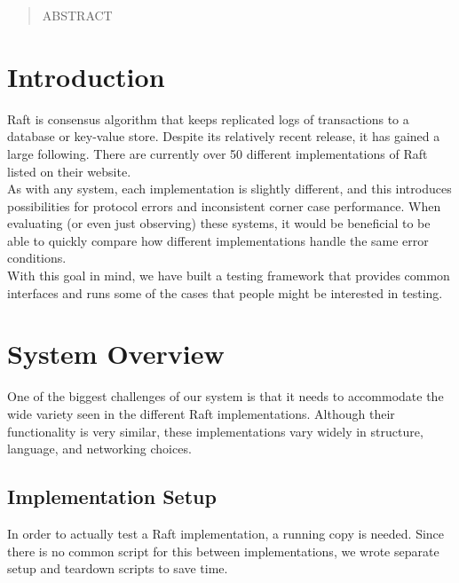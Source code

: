 \documentclass[UTF8]{article}
\begin{document}
 

\setlength\parindent{24pt}

\begin{abstract}
	
ABSTRACT

\end{abstract} 

\section{Introduction}
Raft is consensus algorithm that keeps replicated logs of transactions to a database or key-value store. Despite its relatively recent release, it has gained a large following. There are currently over 50 different implementations of Raft listed on their website. 
\\ \indent As with any system, each implementation is slightly different, and this introduces possibilities for protocol errors and inconsistent corner case performance. When evaluating (or even just observing) these systems, it would be beneficial to be able to quickly compare how different implementations handle the same error conditions. \\ \indent With this goal in mind, we have built a testing framework that provides common interfaces and runs some of the cases that people might be interested in testing.

\section{System Overview}
One of the biggest challenges of our system is that it needs to accommodate the wide variety seen in the different Raft implementations. Although their functionality is very similar, these implementations vary widely in structure, language, and networking choices.
\subsection{Implementation Setup}
In order to actually test a Raft implementation, a running copy is needed. Since there is no common script for this between implementations, we wrote separate setup and teardown scripts to save time. 
\end{document}
